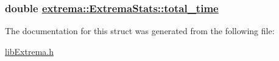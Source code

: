 \hypertarget{structextrema_1_1ExtremaStats_7578983cd091758a981c55cf7d868bd7}{
\subsubsection[total\_\-time]{\setlength{\rightskip}{0pt plus 5cm}double \hyperlink{structextrema_1_1ExtremaStats_7578983cd091758a981c55cf7d868bd7}{extrema::Extrema\-Stats::total\_\-time}}}
\label{structextrema_1_1ExtremaStats_7578983cd091758a981c55cf7d868bd7}




The documentation for this struct was generated from the following file:\begin{CompactItemize}
\item 
\hyperlink{libExtrema_8h}{lib\-Extrema.h}\end{CompactItemize}
